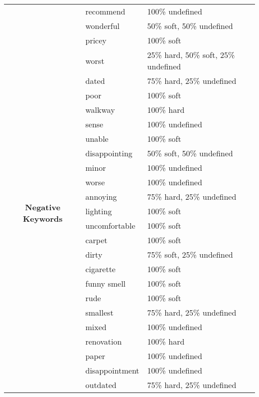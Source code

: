 \documentclass[smallextended,natbib]{svjour3}       %
\begin{document}
\begin{table}[ht]
{\begin{tabular}{|c|l|l|}
       & recommend      & 100\% undefined                      \\ \cline{2-3} 
       & wonderful      & 50\% soft, 50\% undefined            \\ \hline
      \multirow{24}{*}{\textbf{Negative Keywords}} & pricey                                & 100\% soft                                       \\ \cline{2-3} 
       & worst          & 25\% hard, 50\% soft, 25\% undefined \\ \cline{2-3} 
       & dated          & 75\% hard, 25\% undefined            \\ \cline{2-3} 
       & poor           & 100\% soft                           \\ \cline{2-3} 
       & walkway        & 100\% hard                           \\ \cline{2-3} 
       & sense          & 100\% undefined                      \\ \cline{2-3} 
       & unable         & 100\% soft                           \\ \cline{2-3} 
       & disappointing  & 50\% soft, 50\% undefined            \\ \cline{2-3} 
       & minor          & 100\% undefined                      \\ \cline{2-3} 
       & worse          & 100\% undefined                      \\ \cline{2-3} 
       & annoying       & 75\% hard, 25\% undefined            \\ \cline{2-3} 
       & lighting       & 100\% soft                           \\ \cline{2-3} 
       & uncomfortable  & 100\% soft                           \\ \cline{2-3} 
       & carpet         & 100\% soft                           \\ \cline{2-3} 
       & dirty          & 75\% soft, 25\% undefined            \\ \cline{2-3} 
       & cigarette      & 100\% soft                           \\ \cline{2-3} 
       & funny smell    & 100\% soft                           \\ \cline{2-3} 
       & rude           & 100\% soft                           \\ \cline{2-3} 
       & smallest       & 75\% hard, 25\% undefined            \\ \cline{2-3} 
       & mixed          & 100\% undefined                      \\ \cline{2-3} 
       & renovation     & 100\% hard                           \\ \cline{2-3} 
       & paper          & 100\% undefined                      \\ \cline{2-3} 
       & disappointment & 100\% undefined                      \\ \cline{2-3} 
       & outdated       & 75\% hard, 25\% undefined            \\ \hline
      \end{tabular}%
      }
  \end{table}
\end{document}
